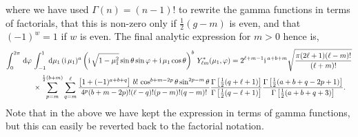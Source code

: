 where we have used \(\Gamma(n)=(n-1)!\) to rewrite the gamma functions in terms of factorials, that this is non-zero only if \(\frac{1}{2}(g-m)\) is even, and that \((-1)^{w}=1\) if \(w\) is even. The final analytic expression for \(m>0\) hence is,  
\begin{align}
\int_0^{2\pi}{\,\mathrm{d}}\varphi\,& \int_{-1}^{1}{\,\mathrm{d}}\mu_1\,(\mathrm{i\,}\mu_1)^a\left(\mathrm{i\,}\sqrt{1-\mu_1^2} \sin\theta \sin\varphi + \mathrm{i\,}\mu_1\cos\theta\right)^b \, Y^*_{\ell m} (\mu_1,\varphi)  = 2^{\ell+m-1}\mathrm{i\,}^{a+b+m}\sqrt{\frac{\pi(2\ell+1)(\ell-m)!}{(\ell+m)!}} \nonumber \\
&\times
\sum_{p=m}^{\frac{1}{2}(b+m)}\sum_{q=m}^{\ell}
\frac{\left[1+(-1)^{a+b+q}\right]\,b!\,\cos^{b+m-2p}\theta\sin^{2p-m}\theta}{4^p(b+m-2p)!(\ell-q)!(p-m)!(q-m)!}
\frac{\Gamma\left[\frac{1}{2}(q+\ell+1)\right]}{\Gamma\left[\frac{1}{2}(q-\ell+1)\right]}
\frac{\Gamma\left[\frac{1}{2}(a+b +q-2p+1)\right]}{\Gamma\left[\frac{1}{2}(a+b+q+3)\right]}.
\end{align}
Note that in the above we have kept the expression in terms of gamma functions, but this can easily be reverted back to the factorial notation.


